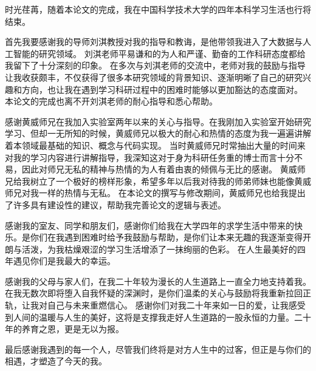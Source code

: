 
\begin{acknowledgements}



    时光荏苒，随着本论文的完成，我在中国科学技术大学的四年本科学习生活也行将结束。

    首先我要感谢我的导师刘淇教授对我的指导和教诲，是他带领我进入了大数据与人工智能的研究领域。
    刘淇老师平易谦和的为人和严谨、勤奋的工作科研态度都给我留下了十分深刻的印象。
    在多次与刘淇老师的交流中，老师对我的鼓励与指导让我收获颇丰，不仅获得了很多本研究领域的背景知识、逐渐明晰了自己的研究兴趣和方向，也让我在遇到学习科研过程中的困难时能够以更加豁达的态度面对。
    本论文的完成也离不开刘淇老师的耐心指导和悉心帮助。

    感谢黄威师兄在我加入实验室两年以来的关心与指导。在我刚加入实验室开始研究学习、但却一无所知的时候，黄威师兄以极大的耐心和热情的态度为我一遍遍讲解着本领域最基础的知识、概念与代码实现。
    当时黄威师兄时常抽出大量的时间来对我的学习内容进行讲解指导，我深知这对于身为科研任务重的博士而言十分不易，因此对师兄无私的精神与热情的为人有着由衷的倾佩与无比的感谢。
    黄威师兄给我树立了一个极好的榜样形象，希望多年以后我对待我的师弟师妹也能像黄威师兄对我一样的热情与无私。
    在本论文的撰写与修改期间，黄威师兄也给我提出了许多具有建设性的建议，帮助我完善论文的逻辑与表述。

    感谢我的室友、同学和朋友们，感谢你们给我在大学四年的求学生活中带来的快乐。是你们在我遇到困难时给予我鼓励与帮助，是你们让本来无趣的我逐渐变得开朗与活泼，为我枯燥艰涩的学习生活增添了一抹绚丽的色彩。
    在人生最美好的四年遇见你们是我最大的幸运。

    感谢我的父母与家人们，在我二十年较为漫长的人生道路上一直全力地支持着我。在我无数次即将堕入自我怀疑的深渊时，是你们温柔的关心与鼓励将我重新拉回正轨，让我对自己与未来重燃信心。
    感谢你们对我二十年来如一日的爱，让我感受到人间的温暖与人生的美好，这将是支撑我走好人生道路的一股永恒的力量。二十年的养育之恩，更是无以为报。

    最后感谢我遇到的每一个人，尽管我们终将是对方人生中的过客，但正是与你们的相遇，才塑造了今天的我。

\end{acknowledgements}
